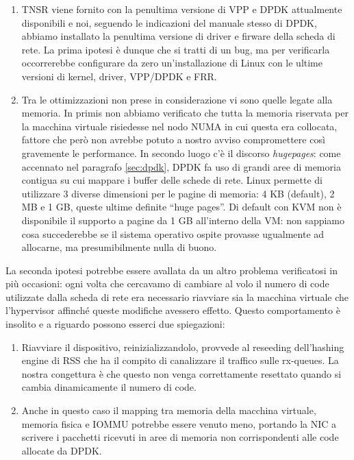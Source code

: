 \begin{enumerate}
    \item TNSR viene fornito con la penultima versione di VPP e DPDK attualmente disponibili e noi, seguendo le indicazioni del manuale stesso di DPDK, abbiamo installato la penultima versione di driver e firware della scheda di rete. La prima ipotesi è dunque che si tratti di un bug, ma per verificarla occorrerebbe configurare da zero un'installazione di Linux con le ultime versioni di kernel, driver, VPP/DPDK e FRR.
    \item Tra le ottimizzazioni non prese in considerazione vi sono quelle legate alla memoria. In primis non abbiamo verificato che tutta la memoria riservata per la macchina virtuale risiedesse nel nodo NUMA in cui questa era collocata, fattore che però non avrebbe potuto a nostro avviso compromettere così gravemente le performance. In secondo luogo c'è il discorso \textit{hugepages}: come accennato nel paragrafo \ref{sec:dpdk}, DPDK fa uso di grandi aree di memoria contigua su cui mappare i buffer delle schede di rete. Linux permette di utilizzare 3 diverse dimensioni per le pagine di memoria: 4 KB (default), 2 MB e 1 GB, queste ultime definite ``huge pages''. Di default con KVM non è disponibile il supporto a pagine da 1 GB all'interno della VM: non sappiamo cosa succederebbe se il sistema operativo ospite provasse ugualmente ad allocarne, ma presumibilmente nulla di buono.
\end{enumerate}

La seconda ipotesi potrebbe essere avallata da un altro problema verificatosi in più occasioni: ogni volta che cercavamo di cambiare al volo il numero di code utilizzate dalla scheda di rete era necessario riavviare sia la macchina virtuale che l'hypervisor affinché queste modifiche avessero effetto. Questo comportamento è insolito e a riguardo possono esserci due spiegazioni:

\begin{enumerate}
    \item Riavviare il dispositivo, reinizializzandolo, provvede al reseeding dell'hashing engine di RSS che ha il compito di canalizzare il traffico sulle \mbox{rx-queues}. La nostra congettura è che questo non venga correttamente resettato quando si cambia dinamicamente il numero di code.
    \item Anche in questo caso il mapping tra memoria della macchina virtuale, memoria fisica e IOMMU potrebbe essere venuto meno, portando la NIC a scrivere i pacchetti ricevuti in aree di memoria non corrispondenti alle code allocate da DPDK.
\end{enumerate}

